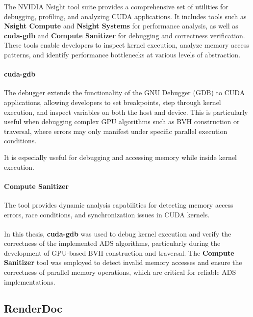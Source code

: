 The NVIDIA Nsight tool suite provides a comprehensive set of utilities for debugging, profiling, and analyzing CUDA applications. It includes tools such as \textbf{Nsight Compute} and \textbf{Nsight Systems} for performance analysis, as well as \textbf{cuda-gdb} and \textbf{Compute Sanitizer} for debugging and correctness verification. These tools enable developers to inspect kernel execution, analyze memory access patterns, and identify performance bottlenecks at various levels of abstraction. \cite{nvidia_nsight,nvidia_cuda_gdb,nvidia_compute_sanitizer}

\paragraph{cuda-gdb} The debugger extends the functionality of the GNU Debugger (GDB) to CUDA applications, allowing developers to set breakpoints, step through kernel execution, and inspect variables on both the host and device. This is particularly useful when debugging complex GPU algorithms such as BVH construction or traversal, where errors may only manifest under specific parallel execution conditions\cite{nvidia_cuda_gdb}.

It is especially useful for debugging and accessing memory while inside kernel execution.

\paragraph{Compute Sanitizer} The tool provides dynamic analysis capabilities for detecting memory access errors, race conditions, and synchronization issues in CUDA kernels. \cite{nvidia_compute_sanitizer}

\paragraph{}
In this thesis, \textbf{cuda-gdb} was used to debug kernel execution and verify the correctness of the implemented ADS algorithms, particularly during the development of GPU-based BVH construction and traversal. The \textbf{Compute Sanitizer} tool was employed to detect invalid memory accesses and ensure the correctness of parallel memory operations, which are critical for reliable ADS implementations.

\subsection{RenderDoc}

